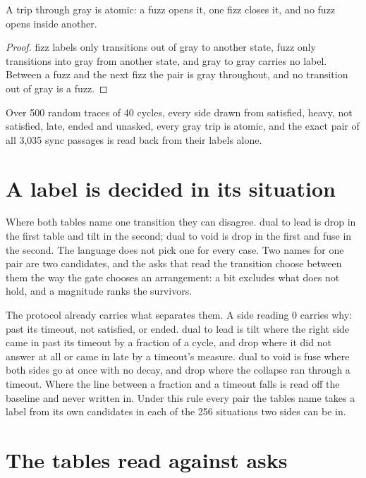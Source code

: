\begin{proposition}
\label{prop:atomic}
A trip through gray is atomic: a fuzz opens it, one fizz closes it, and no fuzz opens inside
another.
\end{proposition}

\begin{proof}
fizz labels only transitions out of gray to another state, fuzz only transitions into gray from
another state, and gray to gray carries no label. Between a fuzz and the next fizz the pair is
gray throughout, and no transition out of gray is a fuzz.
\end{proof}

Over 500 random traces of 40 cycles, every side drawn from satisfied, heavy, not satisfied, late, ended and
unasked, every gray trip is atomic, and the exact pair of all 3,035 sync passages is read back
from their labels alone.

\section{A label is decided in its situation}

Where both tables name one transition they can disagree. dual to lead is drop in the first table
and tilt in the second; dual to void is drop in the first and fuse in the second. The language
does not pick one for every case. Two names for one pair are two candidates, and the asks that
read the transition choose between them the way the gate chooses an arrangement: a bit excludes
what does not hold, and a magnitude ranks the survivors.

The protocol already carries what separates them. A side reading 0 carries why: past its
timeout, not satisfied, or ended. dual to lead is tilt where the right side came in past its timeout
by a fraction of a cycle, and drop where it did not answer at all or came in late by a timeout's
measure. dual to void is fuse where both sides go at once with no decay, and drop where the
collapse ran through a timeout. Where the line between a fraction and a timeout falls is read off
the baseline and never written in. Under this rule every pair the tables name takes a label from
its own candidates in each of the 256 situations two sides can be in.

\section{The tables read against asks}

